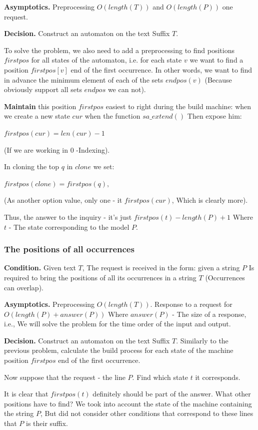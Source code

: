 \textbf{Asymptotics.} Preprocessing $O (length (T))$ and $O (length (P))$ one request.

\textbf{Decision.} Construct an automaton on the text Suffix $T$.

To solve the problem, we also need to add a preprocessing to find positions $firstpos$ for all states of the automaton, i.e. for each state $v$ we want to find a position $firstpos [v]$ end of the first occurrence. In other words, we want to find in advance the minimum element of each of the sets $endpos (v)$ (Because obviously support all sets $endpos$ we can not).

\textbf{Maintain} this position $firstpos$ easiest to right during the build machine: when we create a new state $cur$ when the function $sa \_extend()$ Then expose him:

$firstpos (cur) = len (cur) - 1$

(If we are working in $0$ -Indexing).

In cloning the top $q$ in $clone$ we set:

$firstpos (clone) = firstpos (q),$

(As another option value, only one - it $firstpos (cur)$, Which is clearly more).

Thus, the answer to the inquiry - it's just $firstpos (t)-length (P) +1$ Where $t$ - The state corresponding to the model $P$.

\subsubsection{ The positions of all occurrences }

\textbf{Condition.} Given text $T$, The request is received in the form: given a string $P$ Is required to bring the positions of all its occurrences in a string $T$ (Occurrences can overlap).

\textbf{Asymptotics.} Preprocessing $O (length (T))$. Response to a request for $O (length (P) + answer (P))$ Where $answer (P)$ - The size of a response, i.e., We will solve the problem for the time order of the input and output.

\textbf{Decision.} Construct an automaton on the text Suffix $T$. Similarly to the previous problem, calculate the build process for each state of the machine position $firstpos$ end of the first occurrence.

Now suppose that the request - the line $P$. Find which state $t$ it corresponds.

It is clear that $firstpos (t)$ definitely should be part of the answer. What other positions have to find? We took into account the state of the machine containing the string $P$, But did not consider other conditions that correspond to these lines that $P$ is their suffix.

